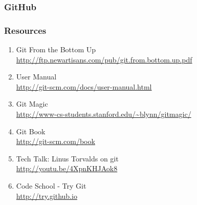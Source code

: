 \documentclass[english,compress]{beamer}
\begin{document}
\frame
{
    \frametitle{GitHub}

}


\frame
{
\small
    \frametitle{Resources}
    \begin{enumerate}
        \item Git From the Bottom Up\\
            \url{http://ftp.newartisans.com/pub/git.from.bottom.up.pdf}
        \item User Manual\\
            \url{http://git-scm.com/docs/user-manual.html}
        \item Git Magic\\
            \url{http://www-cs-students.stanford.edu/~blynn/gitmagic/}
        \item Git Book\\
            \url{http://git-scm.com/book}
        \item Tech Talk: Linus Torvalds on git\\
            \url{http://youtu.be/4XpnKHJAok8} 
        \item Code School - Try Git\\
            \url{http://try.github.io}
    \end{enumerate}
}
\end{document}
